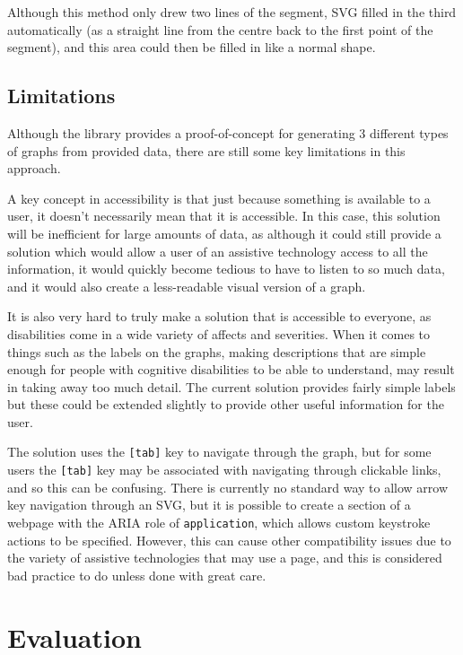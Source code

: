 \documentclass[ %
                    author={Aleena Baig},
                supervisor={Dr Simon Lock},
                    degree={BSc},
                     title={On Making Web Accessible Graphs},
                  subtitle={},
                      year={2019} ]{dissertation}
\begin{document}
Although this method only drew two lines of the segment, SVG filled in the third automatically (as a straight line from the centre back to the first point of the segment), and this area could then be filled in like a normal shape.



\section{Limitations}

Although the library provides a proof-of-concept for generating 3 different types of graphs from provided data, there are still some key limitations in this approach.

A key concept in accessibility is that just because something is available to a user, it doesn't necessarily mean that it is accessible. In this case, this solution will be inefficient for large amounts of data, as although it could still provide a solution which would allow a user of an assistive technology access to all the information, it would quickly become tedious to have to listen to so much data, and it would also create a less-readable visual version of a graph.

It is also very hard to truly make a solution that is accessible to everyone, as disabilities come in a wide variety of affects and severities. When it comes to things such as the labels on the graphs, making descriptions that are simple enough for people with cognitive disabilities to be able to understand, may result in taking away too much detail. The current solution provides fairly simple labels but these could be extended slightly to provide other useful information for the user.

The solution uses the \texttt{[tab]} key to navigate through the graph, but for some users the \texttt{[tab]} key may be associated with navigating through clickable links, and so this can be confusing. There is currently no standard way to allow arrow key navigation through an SVG, but it is possible to create a section of a webpage with the ARIA role of \texttt{application}, which allows custom keystroke actions to be specified. However, this can cause other compatibility issues due to the variety of assistive technologies that may use a page, and this is considered bad practice to do unless done with great care.

\chapter{Evaluation}
\end{document}
